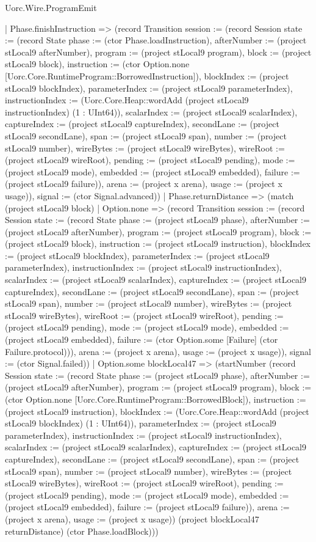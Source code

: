\begin{lexlean}{Uorc.Wire.ProgramEmit}
\begin{semanticmodule}
{        | Phase.finishInstruction => (record Transition {session := (record Session {state := (record State {phase := (ctor Phase.loadInstruction), afterNumber := (project stLocal9 afterNumber), program := (project stLocal9 program), block := (project stLocal9 block), instruction := (ctor Option.none [Uorc.Core.RuntimeProgram::BorrowedInstruction]), blockIndex := (project stLocal9 blockIndex), parameterIndex := (project stLocal9 parameterIndex), instructionIndex := (Uorc.Core.Heap::wordAdd (project stLocal9 instructionIndex) (1 : UInt64)), scalarIndex := (project stLocal9 scalarIndex), captureIndex := (project stLocal9 captureIndex), secondLane := (project stLocal9 secondLane), span := (project stLocal9 span), number := (project stLocal9 number), wireBytes := (project stLocal9 wireBytes), wireRoot := (project stLocal9 wireRoot), pending := (project stLocal9 pending), mode := (project stLocal9 mode), embedded := (project stLocal9 embedded), failure := (project stLocal9 failure)}), arena := (project x arena), usage := (project x usage)}), signal := (ctor Signal.advanced)})
        | Phase.returnDistance => (match (project stLocal9 block)
          | Option.none => (record Transition {session := (record Session {state := (record State {phase := (project stLocal9 phase), afterNumber := (project stLocal9 afterNumber), program := (project stLocal9 program), block := (project stLocal9 block), instruction := (project stLocal9 instruction), blockIndex := (project stLocal9 blockIndex), parameterIndex := (project stLocal9 parameterIndex), instructionIndex := (project stLocal9 instructionIndex), scalarIndex := (project stLocal9 scalarIndex), captureIndex := (project stLocal9 captureIndex), secondLane := (project stLocal9 secondLane), span := (project stLocal9 span), number := (project stLocal9 number), wireBytes := (project stLocal9 wireBytes), wireRoot := (project stLocal9 wireRoot), pending := (project stLocal9 pending), mode := (project stLocal9 mode), embedded := (project stLocal9 embedded), failure := (ctor Option.some [Failure] (ctor Failure.protocol))}), arena := (project x arena), usage := (project x usage)}), signal := (ctor Signal.failed)})
          | Option.some blockLocal47 => (startNumber (record Session {state := (record State {phase := (project stLocal9 phase), afterNumber := (project stLocal9 afterNumber), program := (project stLocal9 program), block := (ctor Option.none [Uorc.Core.RuntimeProgram::BorrowedBlock]), instruction := (project stLocal9 instruction), blockIndex := (Uorc.Core.Heap::wordAdd (project stLocal9 blockIndex) (1 : UInt64)), parameterIndex := (project stLocal9 parameterIndex), instructionIndex := (project stLocal9 instructionIndex), scalarIndex := (project stLocal9 scalarIndex), captureIndex := (project stLocal9 captureIndex), secondLane := (project stLocal9 secondLane), span := (project stLocal9 span), number := (project stLocal9 number), wireBytes := (project stLocal9 wireBytes), wireRoot := (project stLocal9 wireRoot), pending := (project stLocal9 pending), mode := (project stLocal9 mode), embedded := (project stLocal9 embedded), failure := (project stLocal9 failure)}), arena := (project x arena), usage := (project x usage)}) (project blockLocal47 returnDistance) (ctor Phase.loadBlock)))
}
\end{semanticmodule}
\end{lexlean}
